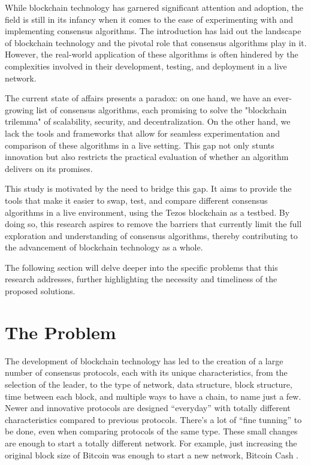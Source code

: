 While blockchain technology has garnered significant attention and adoption, the field is still in its infancy when it comes to the ease of experimenting with and implementing consensus algorithms. The introduction has laid out the landscape of blockchain technology and the pivotal role that consensus algorithms play in it. However, the real-world application of these algorithms is often hindered by the complexities involved in their development, testing, and deployment in a live network. 

The current state of affairs presents a paradox: on one hand, we have an ever-growing list of consensus algorithms, each promising to solve the "blockchain trilemma" of scalability, security, and decentralization. On the other hand, we lack the tools and frameworks that allow for seamless experimentation and comparison of these algorithms in a live setting. This gap not only stunts innovation but also restricts the practical evaluation of whether an algorithm delivers on its promises.

This study is motivated by the need to bridge this gap. It aims to provide the tools that make it easier to swap, test, and compare different consensus algorithms in a live environment, using the Tezos blockchain as a testbed. By doing so, this research aspires to remove the barriers that currently limit the full exploration and understanding of consensus algorithms, thereby contributing to the advancement of blockchain technology as a whole.

The following section will delve deeper into the specific problems that this research addresses, further highlighting the necessity and timeliness of the proposed solutions.

\section{The Problem}
The development of blockchain technology has led to the creation of a large number of consensus protocols, each with its unique characteristics, from the selection of the leader, to the type of network, data structure, block structure, time between each block, and multiple ways to have a chain, to name just a few. Newer and innovative protocols are designed ``everyday'' with totally different characteristics compared to previous protocols. There's a lot of ``fine tunning'' to be done, even when comparing protocols of the same type. These small changes are enough to start a totally different network. For example, just increasing the original block size of Bitcoin was enough to start a new network, Bitcoin Cash \cite{bitcoincash}.
\label{bitcoincashexample}

